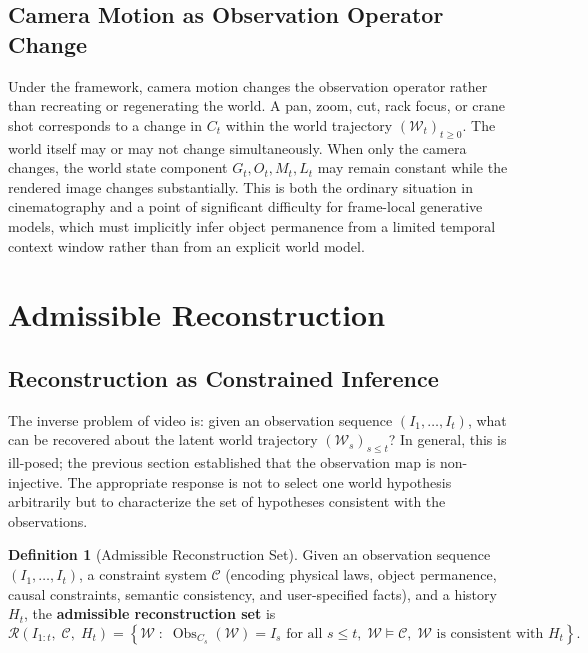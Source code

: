 \documentclass[11pt,a4paper]{article}
\theoremstyle{plain}
\theoremstyle{definition}
\newtheorem{definition}[theorem]{Definition}
\theoremstyle{remark}
\DeclareMathOperator{\Obs}{Obs}
\begin{document}
\subsection{Camera Motion as Observation Operator Change}

Under the framework, camera motion changes the observation operator rather than recreating or regenerating the world. A pan, zoom, cut, rack focus, or crane shot corresponds to a change in $C_t$ within the world trajectory $(\mathcal{W}_t)_{t \geq 0}$. The world itself may or may not change simultaneously. When only the camera changes, the world state component $G_t, O_t, M_t, L_t$ may remain constant while the rendered image changes substantially. This is both the ordinary situation in cinematography and a point of significant difficulty for frame-local generative models, which must implicitly infer object permanence from a limited temporal context window rather than from an explicit world model.

\section{Admissible Reconstruction}
\label{sec:admissible}

\subsection{Reconstruction as Constrained Inference}

The inverse problem of video is: given an observation sequence $(I_1, \ldots, I_t)$, what can be recovered about the latent world trajectory $(\mathcal{W}_s)_{s \leq t}$? In general, this is ill-posed; the previous section established that the observation map is non-injective. The appropriate response is not to select one world hypothesis arbitrarily but to characterize the set of hypotheses consistent with the observations.

\begin{definition}[Admissible Reconstruction Set]
Given an observation sequence $(I_1, \ldots, I_t)$, a constraint system $\mathcal{C}$ (encoding physical laws, object permanence, causal constraints, semantic consistency, and user-specified facts), and a history $H_t$, the \textbf{admissible reconstruction set} is
\[
\mathcal{R}(I_{1:t},\; \mathcal{C},\; H_t) = \left\{ \mathcal{W} \;:\; \Obs_{C_s}(\mathcal{W}) = I_s \text{ for all } s \leq t,\; \mathcal{W} \models \mathcal{C},\; \mathcal{W} \text{ is consistent with } H_t \right\}.
\]
\end{definition}
\end{document}
